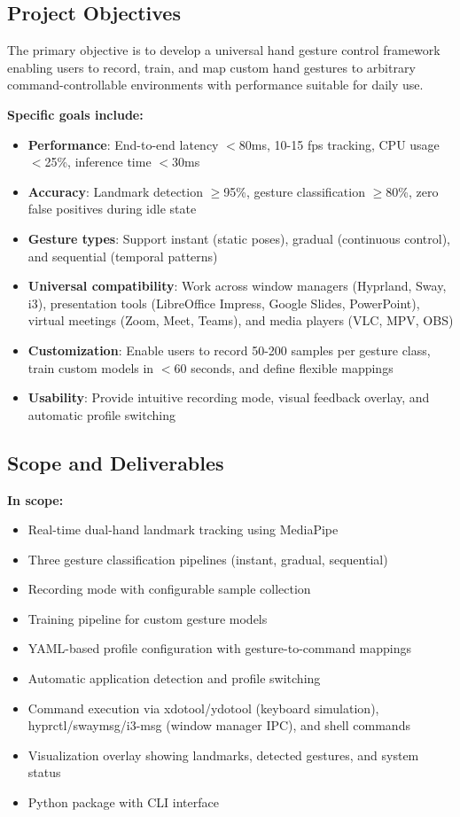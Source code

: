 \documentclass[11pt,a4paper]{article}
\begin{document}
\subsection{Project Objectives}

The primary objective is to develop a universal hand gesture control framework enabling users to record, train, and map custom hand gestures to arbitrary command-controllable environments with performance suitable for daily use.

\textbf{Specific goals include:}

\begin{itemize}
\item \textbf{Performance}: End-to-end latency $<$80ms, 10-15 fps tracking, CPU usage $<$25\%, inference time $<$30ms
\item \textbf{Accuracy}: Landmark detection $\geq$95\%, gesture classification $\geq$80\%, zero false positives during idle state
\item \textbf{Gesture types}: Support instant (static poses), gradual (continuous control), and sequential (temporal patterns)
\item \textbf{Universal compatibility}: Work across window managers (Hyprland, Sway, i3), presentation tools (LibreOffice Impress, Google Slides, PowerPoint), virtual meetings (Zoom, Meet, Teams), and media players (VLC, MPV, OBS)
\item \textbf{Customization}: Enable users to record 50-200 samples per gesture class, train custom models in $<$60 seconds, and define flexible mappings
\item \textbf{Usability}: Provide intuitive recording mode, visual feedback overlay, and automatic profile switching
\end{itemize}

\subsection{Scope and Deliverables}

\textbf{In scope:}
\begin{itemize}
\item Real-time dual-hand landmark tracking using MediaPipe
\item Three gesture classification pipelines (instant, gradual, sequential)
\item Recording mode with configurable sample collection
\item Training pipeline for custom gesture models
\item YAML-based profile configuration with gesture-to-command mappings
\item Automatic application detection and profile switching
\item Command execution via xdotool/ydotool (keyboard simulation), hyprctl/swaymsg/i3-msg (window manager IPC), and shell commands
\item Visualization overlay showing landmarks, detected gestures, and system status
\item Python package with CLI interface
\end{itemize}
\end{document}
